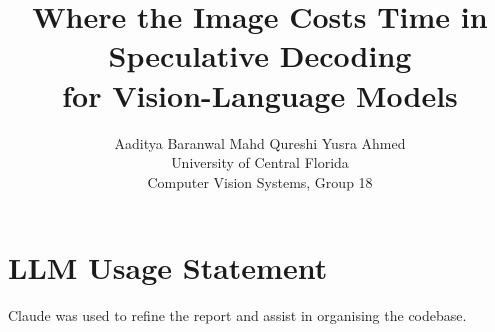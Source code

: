 \documentclass[10pt,twocolumn,letterpaper]{article}
\title{Where the Image Costs Time in Speculative Decoding\\for Vision-Language Models}
\author{Aaditya Baranwal \qquad Mahd Qureshi \qquad Yusra Ahmed\\
University of Central Florida\\
{\small Computer Vision Systems, Group 18}}
\begin{document}
\maketitle








\section*{LLM Usage Statement}
Claude was used to refine the report and assist in organising the codebase.

{
    \small
    
    
}

\clearpage
\appendix

\end{document}
